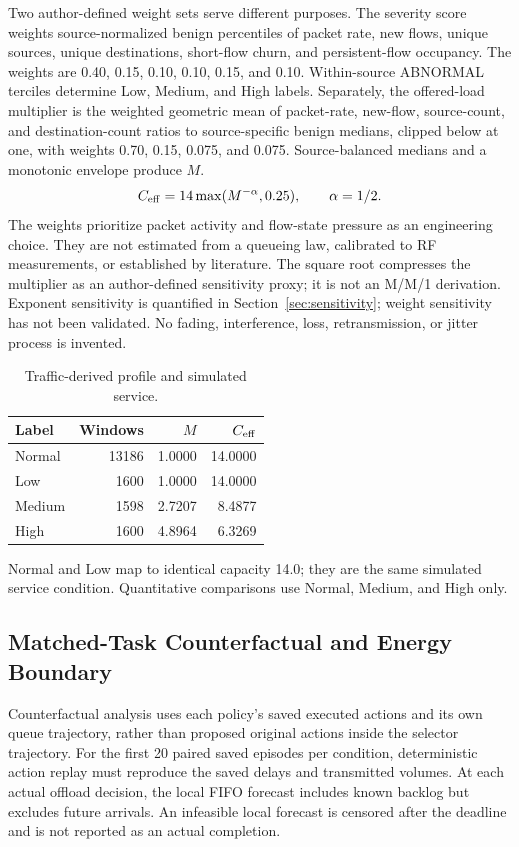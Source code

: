 \documentclass[conference]{IEEEtran}
\begin{document}
Two author-defined weight sets serve different purposes. The severity score weights source-normalized benign percentiles of packet rate, new flows, unique sources, unique destinations, short-flow churn, and persistent-flow occupancy. The weights are 0.40, 0.15, 0.10, 0.10, 0.15, and 0.10. Within-source ABNORMAL terciles determine Low, Medium, and High labels. Separately, the offered-load multiplier is the weighted geometric mean of packet-rate, new-flow, source-count, and destination-count ratios to source-specific benign medians, clipped below at one, with weights 0.70, 0.15, 0.075, and 0.075. Source-balanced medians and a monotonic envelope produce $M$.
\begin{equation}
C_{\rm eff}=14\max(M^{-\alpha},0.25),\qquad \alpha=1/2.
\label{eq:capacity}
\end{equation}
The weights prioritize packet activity and flow-state pressure as an engineering choice. They are not estimated from a queueing law, calibrated to RF measurements, or established by literature. The square root compresses the multiplier as an author-defined sensitivity proxy; it is not an M/M/1 derivation. Exponent sensitivity is quantified in Section~\ref{sec:sensitivity}; weight sensitivity has not been validated. No fading, interference, loss, retransmission, or jitter process is invented.
\begin{table}[t]
\centering\footnotesize
\caption{Traffic-derived profile and simulated service.}
\label{tab:stress}
\begin{tabular}{@{}lrrr@{}}\toprule
Label & Windows & $M$ & $C_{\rm eff}$\\\midrule
Normal & 13186 & 1.0000 & 14.0000 \\
Low & 1600 & 1.0000 & 14.0000 \\
Medium & 1598 & 2.7207 & 8.4877 \\
High & 1600 & 4.8964 & 6.3269 \\
\bottomrule\end{tabular}
\end{table}

Normal and Low map to identical capacity 14.0; they are the same simulated service condition. Quantitative comparisons use Normal, Medium, and High only.

\subsection{Matched-Task Counterfactual and Energy Boundary}
\label{sec:matched}
Counterfactual analysis uses each policy's saved executed actions and its own queue trajectory, rather than proposed original actions inside the selector trajectory. For the first 20 paired saved episodes per condition, deterministic action replay must reproduce the saved delays and transmitted volumes. At each actual offload decision, the local FIFO forecast includes known backlog but excludes future arrivals. An infeasible local forecast is censored after the deadline and is not reported as an actual completion.
\end{document}
